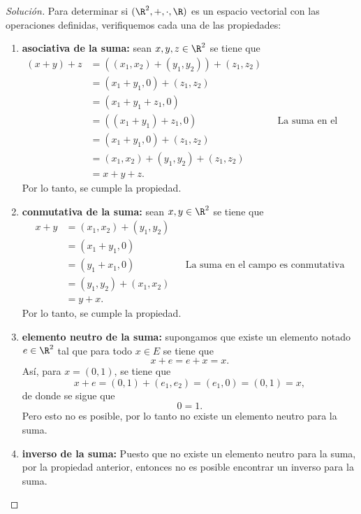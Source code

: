 \documentclass[a4,11pt]{aleph-notas}
\begin{document}
\begin{proof}[Solución]\hspace{0pt}
    Para determinar si $(\R^2,+,\cdot,\R)$ es un espacio vectorial con las operaciones definidas, verifiquemos cada una de las propiedades:
    \begin{enumerate}
    \item \textbf{asociativa de la suma:}
        sean $x,y,z\in \R^2$ se tiene que
        \begin{align*}
             (x + y) + z & = ( (x_1,x_2)+(y_1,y_2)) + (z_1,z_2) \\
             & = (x_1+y_1,0) + (z_1,z_2) \\
             & = (x_1+y_1+z_1,0) \\
             & = ((x_1+y_1)+z_1,0) && \mbox{La suma en el campo es asociativa} \\
             & = (x_1+y_1,0) + (z_1,z_2) \\
             & = (x_1,x_2) + (y_1,y_2) + (z_1,z_2) \\
             & = x+y+z.
        \end{align*}
        Por lo tanto, se cumple la propiedad. 
    \item \textbf{conmutativa de la suma:}
        sean $x,y\in \R^2$ se tiene que
        \begin{align*}
            x + y & = (x_1,x_2) + (y_1,y_2) \\
                & = (x_1 + y_1, 0 ) \\
                & = (y_1 + x_1, 0)  && \mbox{La suma en el campo es conmutativa}\\
                & = (y_1,y_2) + (x_1,x_2) \\
                & = y + x.
        \end{align*}
        Por lo tanto, se cumple la propiedad.
    \item \textbf{elemento neutro de la suma:}
    supongamos que existe un elemento notado $e\in\R^2$ tal que para todo $x\in E$ se tiene que 
    \[
        x + e = e + x = x.
    \]
    Así, para $x=(0,1)$, se tiene que 
    \[
        x + e = (0,1) + (e_1,e_2) = (e_1,0) = (0,1) = x,
    \]
    de donde se sigue que 
    \[
        0 = 1.
    \]
    Pero esto no es posible, por lo tanto no existe un elemento neutro para la suma.
    \item \textbf{inverso de la suma:}
        Puesto que no existe un elemento neutro para la suma, por la propiedad anterior, entonces no es posible encontrar un inverso para la suma. 

\end{enumerate}
\end{proof}
\end{document}
